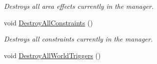 \begin{DoxyCompactItemize}
\begin{DoxyCompactList}\small\item\em Destroys all area effects currently in the manager. \item\end{DoxyCompactList}\item 
void \hyperlink{classphys_1_1PhysicsManager_a34b684f447c56dee94dc80d8df8051eb}{DestroyAllConstraints} ()
\begin{DoxyCompactList}\small\item\em Destroys all constraints currently in the manager. \item\end{DoxyCompactList}\item 
\hypertarget{classphys_1_1PhysicsManager_a778ebdcf3d67f4527978f51bb4249af2}{
void \hyperlink{classphys_1_1PhysicsManager_a778ebdcf3d67f4527978f51bb4249af2}{DestroyAllWorldTriggers} ()}
\label{classphys_1_1PhysicsManager_a778ebdcf3d67f4527978f51bb4249af2}


\end{DoxyCompactItemize}
